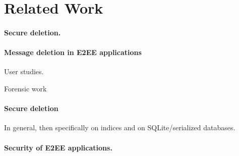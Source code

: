 \section{Related Work}\label{sec:related-work}

\paragraph{Secure deletion.}

\paragraph{Message deletion in E2EE applications} User studies.

Forensic work

\paragraph{Secure deletion} In general, then specifically on indices and on SQLite/serialized databases.

\paragraph{Security of E2EE applications.}